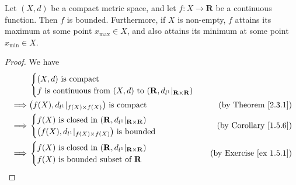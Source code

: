 \begin{proposition}\label{2.3.2}
    Let \((X, d)\) be a compact metric space, and let \(f : X \to \mathbf{R}\) be a continuous function.
    Then \(f\) is bounded.
    Furthermore, if \(X\) is non-empty, \(f\) attains its maximum at some point \(x_{\max} \in X\), and also attains its minimum at some point \(x_{\min} \in X\).
\end{proposition}

\begin{proof}
    We have
    \begin{align*}
                 & \begin{cases}
                       (X, d) \text{ is compact} \\
                       f \text{ is continuous from } (X, d) \text{ to } (\mathbf{R}, d_{l^1}|_{\mathbf{R} \times \mathbf{R}})
                   \end{cases}                                    \\
        \implies & \big(f(X), d_{l^1}|_{f(X) \times f(X)}\big) \text{ is compact}                                                                                                     & \text{(by Theorem \ref{2.3.1})} \\
        \implies & \begin{cases}
                       f(X) \text{ is closed in } (\mathbf{R}, d_{l^1}|_{\mathbf{R} \times \mathbf{R}}) \\
                       \big(f(X), d_{l^1}|_{f(X) \times f(X)}\big) \text{ is bounded}
                   \end{cases}                    & \text{(by Corollary \ref{1.5.6})}                                                         \\
        \implies & \begin{cases}
                       f(X) \text{ is closed in } (\mathbf{R}, d_{l^1}|_{\mathbf{R} \times \mathbf{R}}) \\
                       f(X) \text{ is bounded subset of } \mathbf{R}
                   \end{cases}                    & \text{(by Exercise \ref{ex 1.5.1})}
    \end{align*}


\end{proof}
